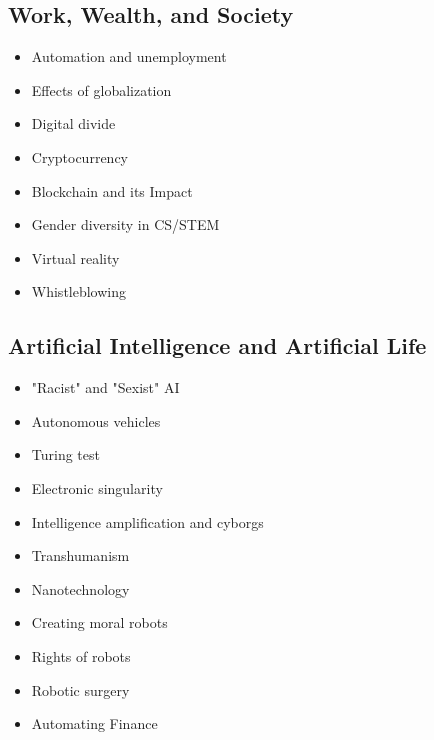 \documentclass[12pt,a4paper]{report}
\begin{document}
\subsection*{Work, Wealth, and Society}
\begin{itemize}
\item Automation and unemployment
\item Effects of globalization
\item Digital divide
\item Cryptocurrency
\item Blockchain and its Impact
\item Gender diversity in CS/STEM
\item Virtual reality
\item Whistleblowing
\end{itemize}

\subsection*{Artificial Intelligence and Artificial Life}
\begin{itemize}
\item "Racist" and "Sexist" AI
\item Autonomous vehicles
\item Turing test
\item Electronic singularity
\item Intelligence amplification and cyborgs
\item Transhumanism
\item Nanotechnology
\item Creating moral robots
\item Rights of robots
\item Robotic surgery
\item Automating Finance
\end{itemize}
\end{document}

